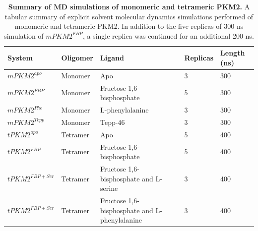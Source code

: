 %
%
%
%
%
\begin{table}
\begin{tabular}{@{}lllll@{}}
\toprule
System            & Oligomer & Ligand                                        & Replicas & Length (ns) \\ \midrule
$mPKM2^{apo}$     & Monomer  & Apo                                           & 3        & 300         \\
$mPKM2^{FBP}$     & Monomer  & Fructose 1,6-bisphosphate                     & 5        & 300    \\
$mPKM2^{Phe}$     & Monomer  & L-phenylalanine                               & 3        & 300         \\
$mPKM2^{Tepp}$    & Monomer  & Tepp-46                                       & 3        & 300         \\
$tPKM2^{apo}$     & Tetramer & Apo                                           & 5        & 400         \\
$tPKM2^{FBP}$     & Tetramer & Fructose 1,6-bisphosphate                     & 5        & 400         \\
$tPKM2^{FBP+Ser}$ & Tetramer & Fructose 1,6-bisphosphate and L-serine        & 3        & 400         \\
$tPKM2^{FBP+Ser}$ & Tetramer & Fructose 1,6-bisphosphate and L-phenylalanine & 3        & 400         \\ \bottomrule
\end{tabular}
\caption[Summary of MD simulations of monomeric and tetrameric PKM2.]{\textbf{Summary of MD simulations of monomeric and tetrameric PKM2.} A tabular summary of explicit solvent molecular dynamics simulations performed of monomeric and tetrameric PKM2. In addition to the five replicas of 300 ns simulation of $mPKM2^{FBP}$, a single replica was continued for an additional 200 ns.}
\end{table}
\clearpage

